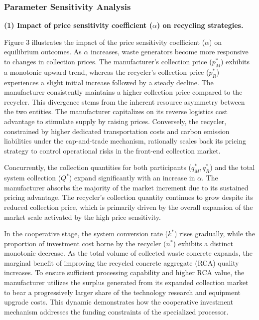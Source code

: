 \documentclass[authoryear,preprint,review,times,10pt]{elsarticle}
\begin{document}
\subsubsection{Parameter Sensitivity Analysis}
\label{sec:sensitivity}

\noindent\textbf{(1) Impact of price sensitivity coefficient ($\alpha$) on recycling strategies.}
\label{sec:alpha_impact}

Figure 3 illustrates the impact of the price sensitivity coefficient ($\alpha$) on equilibrium outcomes. As $\alpha$ increases, waste generators become more responsive to changes in collection prices. The manufacturer's collection price ($p_M^*$) exhibits a monotonic upward trend, whereas the recycler's collection price ($p_R^*$) experiences a slight initial increase followed by a steady decline. The manufacturer consistently maintains a higher collection price compared to the recycler. This divergence stems from the inherent resource asymmetry between the two entities. The manufacturer capitalizes on its reverse logistics cost advantage to stimulate supply by raising prices. Conversely, the recycler, constrained by higher dedicated transportation costs and carbon emission liabilities under the cap-and-trade mechanism, rationally scales back its pricing strategy to control operational risks in the front-end collection market.

Concurrently, the collection quantities for both participants ($q_M^*, q_R^*$) and the total system collection ($Q^*$) expand significantly with an increase in $\alpha$. The manufacturer absorbs the majority of the market increment due to its sustained pricing advantage. The recycler's collection quantity continues to grow despite its reduced collection price, which is primarily driven by the overall expansion of the market scale activated by the high price sensitivity.

In the cooperative stage, the system conversion rate ($k^*$) rises gradually, while the proportion of investment cost borne by the recycler ($n^*$) exhibits a distinct monotonic decrease. As the total volume of collected waste concrete expands, the marginal benefit of improving the recycled concrete aggregate (RCA) quality increases. To ensure sufficient processing capability and higher RCA value, the manufacturer utilizes the surplus generated from its expanded collection market to bear a progressively larger share of the technology research and equipment upgrade costs. This dynamic demonstrates how the cooperative investment mechanism addresses the funding constraints of the specialized processor.
\end{document}
